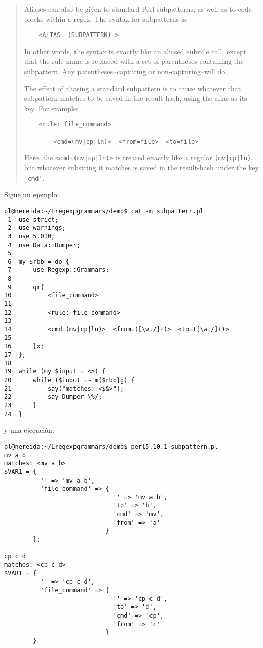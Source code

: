 \begin{it}\begin{quotation}
Aliases can also be given to standard Perl subpatterns, as well as to
code blocks within a regex. The syntax for subpatterns is:

\begin{verbatim}
    <ALIAS= (SUBPATTERN) >
\end{verbatim}

In other words, the syntax is exactly like an aliased subrule call, except
that the rule name is replaced with a set of parentheses containing the
subpattern. Any parentheses--capturing or non-capturing--will do.

The effect of aliasing a standard subpattern is to cause whatever that
subpattern matches to be saved in the result-hash, using the alias as
its key. For example:

\begin{verbatim}
    <rule: file_command>

        <cmd=(mv|cp|ln)>  <from=file>  <to=file>
\end{verbatim}

Here, the \verb#<cmd=(mv|cp|ln)># is treated exactly like a regular \verb#(mv|cp|ln)#,
but whatever substring it matches is saved in the result-hash under the
key \verb|'cmd'|.
\end{quotation}\end{it}
Sigue un ejemplo:
\begin{verbatim}
pl@nereida:~/Lregexpgrammars/demo$ cat -n subpattern.pl
 1  use strict;
 2  use warnings;
 3  use 5.010;
 4  use Data::Dumper;
 5
 6  my $rbb = do {
 7      use Regexp::Grammars;
 8
 9      qr{
10          <file_command>
11
12          <rule: file_command>
13
14          <cmd=(mv|cp|ln)>  <from=([\w./]+)>  <to=([\w./]+)>
15
16      }x;
17  };
18
19  while (my $input = <>) {
20      while ($input =~ m{$rbb}g) {
21          say("matches: <$&>");
22          say Dumper \%/;
23      }
24  }
\end{verbatim}
y una ejecución:
\begin{verbatim}
pl@nereida:~/Lregexpgrammars/demo$ perl5.10.1 subpattern.pl
mv a b
matches: <mv a b>
$VAR1 = {
          '' => 'mv a b',
          'file_command' => {
                              '' => 'mv a b',
                              'to' => 'b',
                              'cmd' => 'mv',
                              'from' => 'a'
                            }
        };

cp c d
matches: <cp c d>
$VAR1 = {
          '' => 'cp c d',
          'file_command' => {
                              '' => 'cp c d',
                              'to' => 'd',
                              'cmd' => 'cp',
                              'from' => 'c'
                            }
        }
\end{verbatim}

